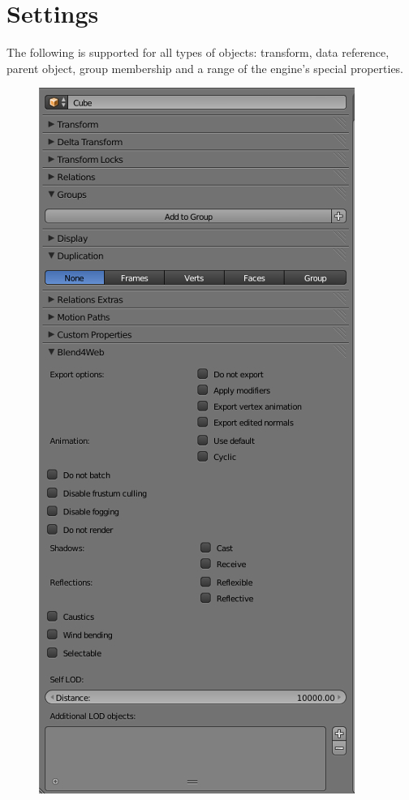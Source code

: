 \documentclass[a4paper,12pt,oneside]{sphinxmanual}
\begin{document}
\section{Settings}
\label{objects:id3}
The following is supported for all types of objects: transform, data reference, parent object, group membership and a range of the engine's special properties.
\begin{figure}[htbp]
\centering

\includegraphics[width=0.600\linewidth]{object_setup.jpg}
\end{figure}
\end{document}

